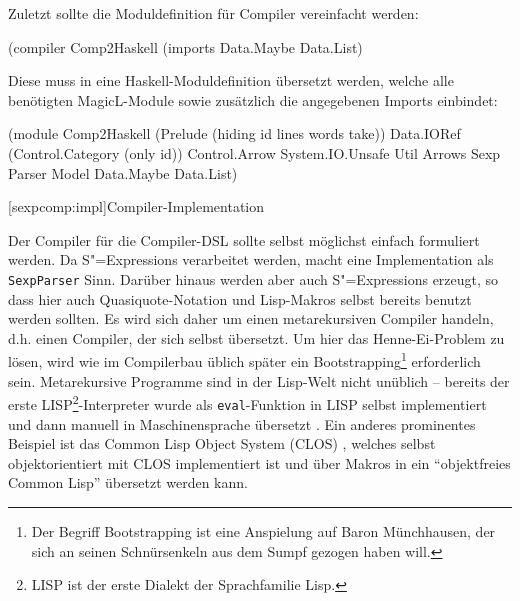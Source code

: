 \documentclass[11pt, a4paper, bibgerm]{scrbook}
\newenvironment{DIFnomarkup}{}{}
\newcommand\icode[1]{\lstinline?#1?}
\newcommand\lsection{}
\newcommand{\sexps}{S"=Expressions}
\begin{document}
Zuletzt sollte die Moduldefinition für Compiler vereinfacht werden:
\begin{DIFnomarkup}\begin{code}
(compiler Comp2Haskell (imports Data.Maybe Data.List)  
\end{code}\end{DIFnomarkup}
Diese muss in eine Haskell-Moduldefinition übersetzt werden, welche alle
benötigten MagicL-Module sowie zusätzlich die angegebenen Imports
einbindet:
\begin{DIFnomarkup}\begin{code}
(module
  Comp2Haskell
  (Prelude (hiding id lines words take))
  Data.IORef
  (Control.Category (only id))
  Control.Arrow
  System.IO.Unsafe
  Util
  Arrows
  Sexp
  Parser
  Model
  Data.Maybe
  Data.List)
\end{code}\end{DIFnomarkup}

\lsection[sexpcomp:impl]{Compiler-Implementation}

Der Compiler für die Compiler-DSL sollte selbst möglichst einfach
formuliert werden. Da \sexps{} verarbeitet werden, macht eine
Implementation als \icode{SexpParser} Sinn. Darüber hinaus werden aber
auch \sexps{} erzeugt, so dass hier auch Quasiquote-Notation und
Lisp-Makros selbst bereits benutzt werden sollten. Es wird sich daher um
einen metarekursiven Compiler handeln, d.h. einen Compiler, der sich
selbst übersetzt. Um hier das Henne-Ei-Problem zu lösen, wird wie im
Compilerbau üblich später ein Bootstrapping\footnote{Der Begriff
  Bootstrapping ist eine Anspielung auf Baron Münchhausen, der sich an
  seinen Schnürsenkeln aus dem Sumpf gezogen haben will.} erforderlich
sein. Metarekursive Programme sind in der Lisp-Welt nicht unüblich --
bereits der erste LISP\footnote{LISP ist der erste Dialekt der
  Sprachfamilie Lisp.}-Interpreter wurde als \icode{eval}-Funktion in
LISP selbst implementiert und dann manuell in Maschinensprache übersetzt
\cite{LispHistory}. Ein anderes prominentes Beispiel ist das Common Lisp
Object System (CLOS) \cite{MetaobjectProtocol}, welches selbst
objektorientiert mit CLOS implementiert ist und über Makros in ein
``objektfreies Common Lisp'' übersetzt werden kann.
\end{document}
